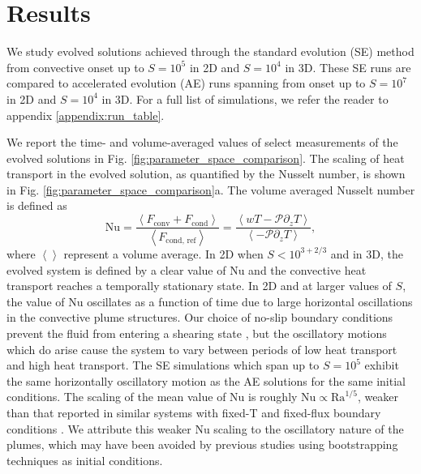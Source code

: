 \documentclass[aps, pre, onecolumn, nofootinbib, notitlepage, groupedaddress, amsfonts, amssymb, amsmath, longbibliography]{revtex4-1}
\newcommand{\angles}[1]{\ensuremath{\left\langle #1 \right\rangle}}
\begin{document}

\section{Results}
\label{sec:results}
We study evolved solutions achieved through the standard evolution (SE) method 
from convective onset
up to $S = 10^5$ in 2D and $S = 10^4$ in 3D.  These SE runs are compared to
accelerated evolution (AE) runs spanning from onset up to $S = 10^7$ in 2D and $S = 10^4$ in 3D.
For a full list of simulations, we refer the reader to appendix \ref{appendix:run_table}.

We report the time- and volume-averaged values of select measurements of the
evolved solutions in Fig. \ref{fig:parameter_space_comparison}.
The scaling of heat transport in the evolved solution, as quantified by the
Nusselt number, is shown in Fig. \ref{fig:parameter_space_comparison}a.
The volume averaged Nusselt number is defined as
\begin{equation}
\text{Nu} = \frac{\angles{F_{\text{conv}} + F_{\text{cond}}}}{\angles{F_{\text{cond, ref}}}}
 = \frac{\angles{wT - \mathcal{P}\partial_z T}}{\angles{- \mathcal{P} \partial_z T}},
\end{equation}
where $\angles{}$ represent a volume average.
In 2D when $S < 10^{3+2/3}$ and in 3D, the evolved system is defined by a clear
value of Nu and the convective heat transport reaches a temporally stationary state.
In 2D and at larger values of $S$, the value of Nu oscillates as a function of time
due to large horizontal oscillations in the convective plume structures.
Our choice of no-slip
boundary conditions prevent the fluid from entering a shearing state
\cite{goluskin&all2014}, but the oscillatory motions which do arise cause the
system to vary between periods of low heat transport and high heat transport.
The SE simulations which span up to $S = 10^5$ exhibit the same horizontally
oscillatory motion as the AE solutions for the same initial conditions. The
scaling of the mean value of Nu is roughly $\text{Nu} \propto \text{Ra}^{1/5}$,
weaker than that reported in similar systems with fixed-T and fixed-flux boundary
conditions \cite{johnston&doering2009}.  We attribute this weaker Nu scaling to
the oscillatory nature of the plumes, which may have been avoided by previous studies
using bootstrapping techniques as initial conditions.
\end{document}
